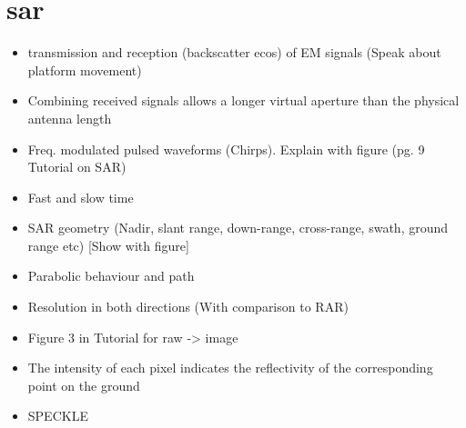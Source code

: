 

\section{\acf{sar}} \label{sec:theory.sar}
\begin{itemize}
    \item transmission and reception (backscatter ecos) of EM signals (Speak about platform movement)
    \item Combining received signals allows a longer virtual aperture than the physical antenna length
    \item Freq. modulated pulsed waveforms (Chirps). Explain with figure (pg. 9 Tutorial on SAR)
    \item Fast and slow time
    \item SAR geometry (Nadir, slant range, down-range, cross-range, swath, ground range etc) [Show with figure]
    \item Parabolic behaviour and path
    \item Resolution in both directions (With comparison to RAR)
    \item Figure 3 in Tutorial for raw -> image
    \item The intensity of each pixel indicates the reflectivity of the corresponding point on the ground
    \item SPECKLE
\end{itemize}

